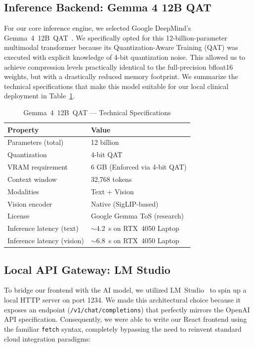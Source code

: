 \documentclass[9pt,conference]{IEEEtran}
\begin{document}
\subsection{Inference Backend: Gemma 4 12B QAT}
\label{subsec:backend}

For our core inference engine, we selected Google DeepMind's Gemma~4~12B~QAT~\cite{gemma4}. We specifically opted for this 12-billion-parameter multimodal transformer because its Quantization-Aware Training (QAT) was executed with explicit knowledge of 4-bit quantization noise. This allowed us to achieve compression levels practically identical to the full-precision bfloat16 weights, but with a drastically reduced memory footprint. We summarize the technical specifications that make this model suitable for our local clinical deployment in Table~\ref{tab:model}.

\begin{table}[H]
  \centering
  \scriptsize
  \caption{Gemma~4~12B~QAT --- Technical Specifications}
  \label{tab:model}
  \begin{tabular}{@{}ll@{}}
    \toprule
    \textbf{Property} & \textbf{Value} \\
    \midrule
    Parameters (total) & 12 billion \\
    Quantization & 4-bit QAT \\
    VRAM requirement & 6 GB (Enforced via 4-bit QAT) \\
    Context window & 32,768 tokens \\
    Modalities & Text + Vision \\
    Vision encoder & Native (SigLIP-based) \\
    License & Google Gemma ToS (research) \\
    Inference latency (text) & $\sim$4.2~s on RTX~4050 Laptop \\
    Inference latency (vision) & $\sim$6.8~s on RTX~4050 Laptop \\
    \bottomrule
  \end{tabular}
\end{table}


\subsection{Local API Gateway: LM Studio}
\label{subsec:local}

To bridge our frontend with the AI model, we utilized LM~Studio~\cite{lmstudio} to spin up a local HTTP server on port 1234. We made this architectural choice because it exposes an endpoint (\texttt{/v1/chat/completions}) that perfectly mirrors the OpenAI API specification. Consequently, we were able to write our React frontend using the familiar \texttt{fetch} syntax, completely bypassing the need to reinvent standard cloud integration paradigms:
\end{document}
